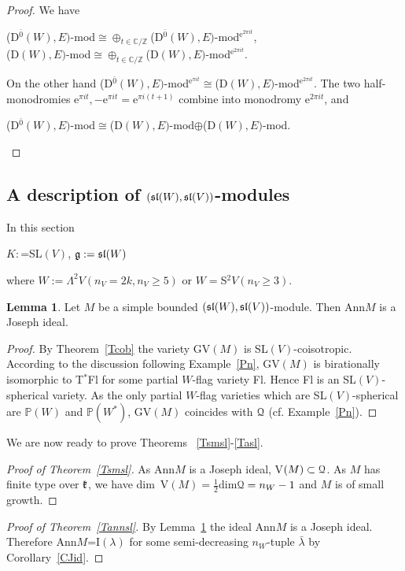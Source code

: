 \documentclass[12pt]{amsart}
\theoremstyle{definition}\newtheorem{theorem}{Theorem}[section]
\newtheorem{lemma}[proposition]{Lemma}
\theoremstyle{definition}\newtheorem{definition}[proposition]{Definition}
\theoremstyle{remark}\newtheorem{example}[proposition]{Example}
\begin{document}
\begin{proof}We have\begin{center}(D$^{\bar 0}(W), E)$-mod$\cong\oplus_{t\in\mathbb C/\mathbb Z}$(D$^{\bar 0}(W), E)$-mod$^{\mathrm e^{2\pi it}}$,\\(D$(W), E)$-mod$\cong\oplus_{t\in\mathbb C/\mathbb Z}$(D$(W), E)$-mod$^{\mathrm e^{2\pi it}}$.\end{center}On the other hand (D$^{\bar 0}(W), E)$-mod$^{\mathrm e^{\pi it}}\cong$(D$(W), E)$-mod$^{\mathrm e^{2\pi it}}$. The two half-monodromies e$^{\pi it}, -$e$^{\pi it}=$e$^{\pi i(t+1)}$ combine into monodromy e$^{2\pi it}$, and\begin{center}(D$^{\bar 0}(W), E)$-mod$\cong$(D$(W), E)$-mod$\oplus$(D$(W), E)$-mod.\end{center}\end{proof}
\subsection{A description of $(\frak{sl}(W), \frak{sl}(V))$-modules}\label{SSdsl}In this section\begin{center}$K:$=SL$(V)$, $\frak g:=\frak{sl}(W)$\end{center} where $W:=\Lambda^2V (n_V=2k, n_V\ge5)$ or $W=$S$^2V (n_V\ge3)$.
\begin{lemma}\label{LslJ} Let $M$ be a simple bounded $(\frak{sl}(W), \frak{sl}(V))$-module. Then Ann$M$ is a Joseph ideal.\end{lemma}
\begin{proof} By Theorem~\ref{Tcob} the variety GV$(M)$ is SL$(V)$-coisotropic. According to the discussion following Example~\ref{Pn}, GV$(M)$ is birationally isomorphic to T$^*$Fl for some partial $W$-flag variety Fl. Hence Fl is an SL$(V)$-spherical variety. As the only partial $W$-flag varieties which are SL$(V)$-spherical are $\mathbb P(W)$ and $\mathbb P(W^*)$, GV$(M)$ coincides with $\EuScript Q$ (cf. Example~\ref{Pn}).\end{proof}
We are now ready to prove Theorems ~\ref{Tsmsl}-\ref{Tasl}. %
\begin{proof}[Proof of Theorem~\ref{Tsmsl}] As Ann$M$ is a Joseph ideal, V$(M)\subset\EuScript Q$. As $M$ has finite type over $\frak k$, we have dim~V$(M)=\frac{1}{2}$dim$\EuScript Q=n_W-1$ and $M$ is of small growth.\end{proof}
\begin{proof}[Proof of Theorem~\ref{Tannsl}]By Lemma~\ref{LslJ} the ideal Ann$M$ is a Joseph ideal. Therefore Ann$M$=I$(\lambda)$ for some semi-decreasing $n_W$-tuple $\bar\lambda$ by Corollary~\ref{CJid}.\end{proof}
\end{document}
